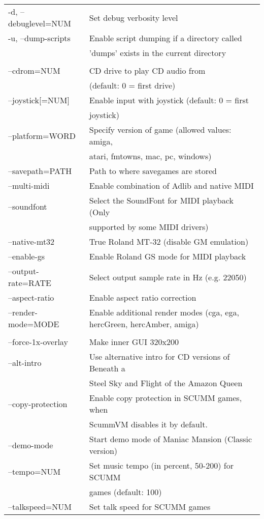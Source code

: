 \begin{tabular}{ll}
  -d, --debuglevel=NUM    &Set debug verbosity level\\
  -u, --dump-scripts      &Enable script dumping if a directory called\\
                          &'dumps' exists in the current directory\\
\\
  --cdrom=NUM             &CD drive to play CD audio from\\
                          &(default: 0 = first drive)\\
  --joystick[=NUM]        &Enable input with joystick (default: 0 = first\\
                          &joystick)\\
  --platform=WORD         &Specify version of game (allowed values: amiga,\\
                          &atari, fmtowns, mac, pc, windows)\\
  --savepath=PATH         &Path to where savegames are stored\\
  --multi-midi            &Enable combination of Adlib and native MIDI\\
  --soundfont             &Select the SoundFont for MIDI playback (Only\\
                          &supported by some MIDI drivers)\\
  --native-mt32           &True Roland MT-32 (disable GM emulation)\\
  --enable-gs	     	   &Enable Roland GS mode for MIDI playback\\
  --output-rate=RATE      &Select output sample rate in Hz (e.g. 22050)\\
  --aspect-ratio          &Enable aspect ratio correction\\
  --render-mode=MODE      &Enable additional render modes (cga, ega, hercGreen, hercAmber, amiga)\\
\\
  --force-1x-overlay      &Make inner GUI 320x200\\
  --alt-intro             &Use alternative intro for CD versions of Beneath a\\
                          &Steel Sky and Flight of the Amazon Queen\\
  --copy-protection       &Enable copy protection in SCUMM games, when\\
                          &ScummVM disables it by default.\\
  --demo-mode             &Start demo mode of Maniac Mansion (Classic version)\\
  --tempo=NUM             &Set music tempo (in percent, 50-200) for SCUMM\\
                          &games (default: 100)\\
  --talkspeed=NUM         &Set talk speed for SCUMM games\\
\end{tabular}

